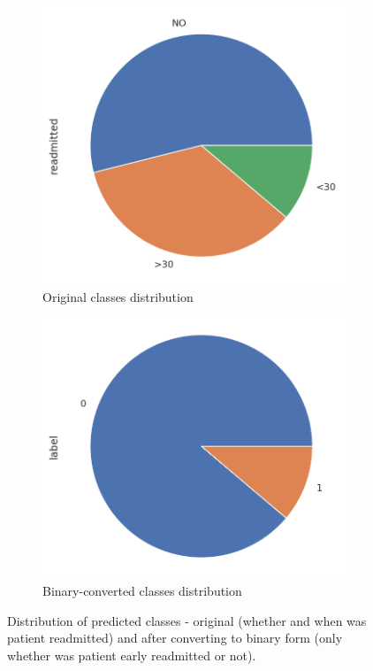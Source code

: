 \documentclass[runningheads]{llncs}
\begin{document}
\begin{figure}
    \centering
    \begin{subfigure}{.5\textwidth}
        \centering
        \includegraphics[width=\linewidth]{figures/classes_original.png}
        \caption{Original classes distribution}
        \label{fig:classes_original}
    \end{subfigure}%
    \begin{subfigure}{.5\textwidth}
        \centering
        \includegraphics[width=\linewidth]{figures/classes_binary.png}
        \caption{Binary-converted classes distribution}
        \label{fig:classes_binary}
    \end{subfigure}
    \label{fig:classes_distribution}
    \caption{Distribution of predicted classes - original (whether and when was patient readmitted) and after converting to binary form (only whether was patient early readmitted or not).}
\end{figure}
\end{document}

